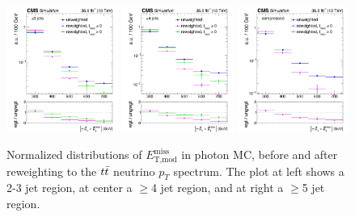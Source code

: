 \begin{figure}[htb]
\centering
\includegraphics[width=0.325\textwidth]{figures/metres_PhotonMC_WgtVsUnwgt_AB.pdf}
\includegraphics[width=0.325\textwidth]{figures/metres_PhotonMC_WgtVsUnwgt_CDEFGH.pdf}
\includegraphics[width=0.325\textwidth]{figures/metres_PhotonMC_WgtVsUnwgt_I.pdf}
\caption{Normalized distributions of $E_\text{T,mod}^\text{miss}$ in
  photon MC, before and after reweighting to the $t\bar{t}$ neutrino $p_T$
  spectrum. The plot at left shows a 2-3 jet region, at center a
  $\geq$4 jet region, and at right a $\geq$5 jet region.}
\label{fig:metres:reweighting}
\end{figure}

